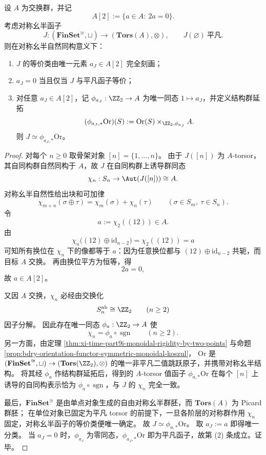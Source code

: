 \begin{theorem}\label{thm:conclusion-monoidal-jump-theory-a2torsion-classification}
设 \(A\) 为交换群，并记
\[
A[2]:=\{a\in A:\ 2a=0\}.
\]
考虑对称幺半函子
\[
J:(\mathbf{FinSet}^{\cong},\sqcup)\to (\mathbf{Tors}(A),\otimes),
\qquad
J(\varnothing)\ \text{平凡}.
\]
则在对称幺半自然同构意义下：
\begin{enumerate}
  \item \(J\) 的等价类由唯一元素 \(a_J\in A[2]\) 完全刻画；
  \item \(a_J=0\) 当且仅当 \(J\) 与平凡函子等价；
  \item 对任意 \(a_J\in A[2]\)，记 \(\phi_{a_J}:\ZZ_2\to A\) 为唯一同态 \(1\mapsto a_J\)，并定义结构群延拓
  \[
  (\phi_{a_J,\ast}\mathrm{Or})(S)
  :=
  \mathrm{Or}(S)\times_{\ZZ_2,\phi_{a_J}} A.
  \]
  则 \(J\simeq \phi_{a_J,\ast}\mathrm{Or}\)。
\end{enumerate}
\end{theorem}
\begin{proof}
对每个 \(n\ge 0\) 取骨架对象 \([n]=\{1,\dots,n\}\)。
由于 \(J([n])\) 为 \(A\)-torsor，其自同构群自然同构于 \(A\)，故 \(J\) 在自同构群上诱导群同态
\[
\chi_n:S_n\to \Aut(J([n]))\cong A.
\]
对称幺半自然性给出块和可加律
\[
\chi_{m+n}(\sigma\oplus\tau)=\chi_m(\sigma)+\chi_n(\tau)
\qquad
(\sigma\in S_m,\ \tau\in S_n).
\]
令
\[
a:=\chi_2((12))\in A.
\]
由
\[
\chi_n\bigl((12)\oplus\mathrm{id}_{n-2}\bigr)=\chi_2((12))=a
\]
可知所有换位在 \(\chi_n\) 下的像都等于 \(a\)：因为任意换位都与 \((12)\oplus\mathrm{id}_{n-2}\) 共轭，而目标 \(A\) 交换。
再由换位平方为恒等，得
\[
2a=0,
\]
故 \(a\in A[2]\)。

又因 \(A\) 交换，\(\chi_n\) 必经由交换化
\[
S_n^{\mathrm{ab}}\cong \ZZ_2
\qquad (n\ge 2)
\]
因子分解。
因此存在唯一同态 \(\phi_a:\ZZ_2\to A\) 使
\[
\chi_n=\phi_a\circ \operatorname{sgn}
\qquad (n\ge 2).
\]
另一方面，由定理 \ref{thm:xi-time-part9i-monoidal-rigidity-by-two-points} 与命题 \ref{prop:bdry-orientation-functor-symmetric-monoidal-koszul}，
\(\mathrm{Or}\) 是 \((\mathbf{FinSet}^{\cong},\sqcup)\to(\mathbf{Tors}(\ZZ_2),\otimes)\) 的唯一非平凡二值跳跃原子，并携带对称幺半结构。
将其经 \(\phi_a\) 作结构群延拓后，得到的 \(A\)-torsor 值函子 \(\phi_{a,\ast}\mathrm{Or}\) 在每个 \([n]\) 上诱导的自同构表示恰为 \(\phi_a\circ\operatorname{sgn}\)，与 \(J\) 的 \(\chi_n\) 完全一致。

最后，\(\mathbf{FinSet}^{\cong}\) 是由单点对象生成的自由对称幺半群胚，而 \(\mathbf{Tors}(A)\) 为 Picard 群胚；
在单位对象已固定为平凡 torsor 的前提下，一旦各阶层的对称群作用 \(\chi_n\) 固定，对称幺半函子的等价类便唯一确定。
故 \(J\simeq \phi_{a,\ast}\mathrm{Or}\)。
取 \(a_J:=a\) 即得唯一分类。
当 \(a_J=0\) 时，\(\phi_{a_J}\) 为零同态，\(\phi_{a_J,\ast}\mathrm{Or}\) 即为平凡函子，故第 (2) 条成立。证毕。
\end{proof}

